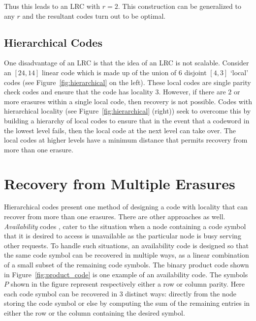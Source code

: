 \begin{multicols}{2}
Thus this leads to an LRC with $r=2$.  This construction can be generalized to any $r$ and the resultant codes turn out to be optimal.

\subsection{Hierarchical Codes} 	

One disadvantage of an LRC is that the idea of an LRC is not scalable. Consider an $[24,14]$ linear code which is made up of the union of $6$ disjoint $[4,3]$ `local' codes (see Figure~\ref{fig:hierarchical} on the left).  These local codes are single parity check codes and ensure that the code has locality $3$.  However, if there are $2$ or more erasures within a single local code, then recovery is not possible.  Codes with hierarchical locality \cite{SasAgaKum_loc} (see Figure~\ref{fig:hierarchical} (right)) seek to overcome this by building a hierarchy of local codes to ensure that in the event that a codeword in the lowest level fails, then the local code at the next level can take over.  The local codes at higher levels have a minimum distance that permits recovery from more than one erasure.
\vskip -0.8cm

\section{Recovery from Multiple Erasures} 

\vskip -0.3cm

Hierarchical codes present one method of designing a code with locality that can recover from more than one erasures.  There are other approaches as well.  {\em Availability} codes \cite{WanZha}, \cite{WanZhaLiu} cater to the situation when a node containing a code symbol that it is desired to access is unavailable as the particular node is busy serving other requests.  To handle such situations, an availability code is designed so that the same code symbol can be recovered in multiple ways, as a linear combination of a small subset of the remaining code symbols.  The binary product code shown in Figure~\ref{fig:product_code} is one example of an availability code.  The symbols $P$ shown in the figure represent respectively either a row or column parity. Here each code symbol can be recovered in $3$ distinct ways: directly from the node storing the code symbol or else by computing the sum of the remaining entries in either the row or the column containing the desired symbol.


\end{multicols}
